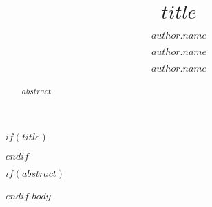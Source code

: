 \documentclass[11pt, a4paper]{article}
\date{}
\title{$title$}
\author[$author.affilnumber$*]{$author.name$}
\author[$author.affilnumber$]{$author.name$}
\author{$author.name$}
\affil[$affil.number$]{$affil.name$}
\affil[*]{\corresponding}
\begin{document}
	
	$if(title)$
	\maketitle
	$endif$
	
	$if(abstract)$
	\begin{abstract}
		\noindent
		$abstract$
	\end{abstract}
	$endif$
	\setlength\parindent{.5cm}
	$body$
	
\end{document}
